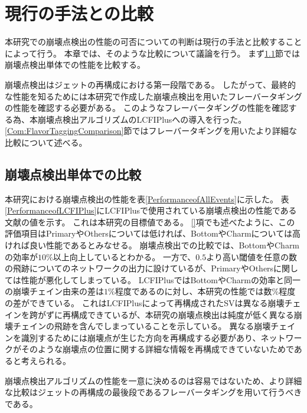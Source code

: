 
\chapter{現行の手法との比較} \label{chap:Comparison}

本研究での崩壊点検出の性能の可否についての判断は現行の手法と比較することによって行う。
本章では、そのような比較について議論を行う。
まず\ref{Com:ComparisonwithVF}節では崩壊点検出単体での性能を比較する。

崩壊点検出はジェットの再構成における第一段階である。
したがって、最終的な性能を知るためには本研究で作成した崩壊点検出を用いたフレーバータギングの性能を確認する必要がある。
このようなフレーバータギングの性能を確認する為、本崩壊点検出アルゴリズムのLCFIPlusへの導入を行った。
\ref{Com:FlavorTaggingComparison}節ではフレーバータギングを用いたより詳細な比較について述べる。


\section{崩壊点検出単体での比較} \label{Com:ComparisonwithVF}

本研究における崩壊点検出の性能を表\ref{PerformanceofAllEvents}に示した。
表\ref{PerformanceofLCFIPlus}にLCFIPlusで使用されている崩壊点検出の性能である文献\cite{LCFIPlusPaper}の値を示す。
これは本研究の目標値である。
\ref{}項でも述べたように、この評価項目はPrimaryやOthersについては低ければ、BottomやCharmについては高ければ良い性能であるとみなせる。
崩壊点検出での比較では、BottomやCharmの効率が$10\%$以上向上しているとわかる。
一方で、$0.5$より高い閾値を任意の数の飛跡についてのネットワークの出力に設けているが、PrimaryやOthersに関しては性能が悪化してしまっている。
LCFIPlusではBottomやCharmの効率と同一の崩壊チェイン由来の差は$1\%$程度であるのに対し、本研究の性能では数\%程度の差ができている。
これはLCFIPlusによって再構成されたSVは異なる崩壊チェインを跨がずに再構成できているが、本研究の崩壊点検出は純度が低く異なる崩壊チェインの飛跡を含んでしまっていることを示している。
異なる崩壊チェインを識別するためには崩壊点が生じた方向を再構成する必要があり、ネットワークがそのような崩壊点の位置に関する詳細な情報を再構成できていないためであると考えられる。

崩壊点検出アルゴリズムの性能を一意に決めるのは容易ではないため、より詳細な比較はジェットの再構成の最後段であるフレーバータギングを用いて行うべきである。

